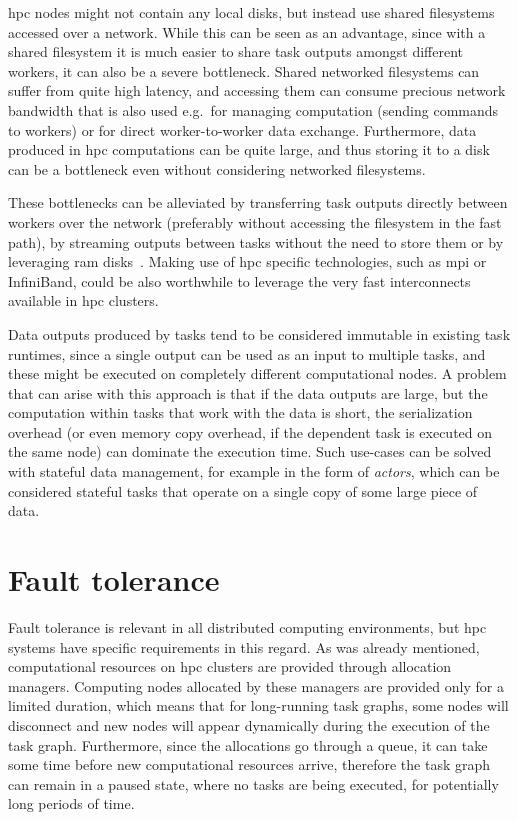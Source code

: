 \gls{hpc} nodes might not contain any local disks, but instead use shared
filesystems accessed over a network. While this can be seen as an advantage, since with a shared
filesystem it is much easier to share task outputs amongst different workers, it can also be a
severe bottleneck. Shared networked filesystems can suffer from quite high latency, and accessing
them can consume precious network bandwidth that is also used e.g.\ for managing computation
(sending commands to workers) or for direct worker-to-worker data exchange. Furthermore, data
produced in \gls{hpc} computations can be quite large, and thus storing it to a
disk can be a bottleneck even without considering networked filesystems.

These bottlenecks can be alleviated by transferring task outputs directly between workers over the
network (preferably without accessing the filesystem in the fast path), by streaming outputs
between tasks without the need to store them or by leveraging \gls{ram}
disks~\cite{hyperloom}. Making use of \gls{hpc} specific technologies,
such as \gls{mpi} or InfiniBand, could be also worthwhile to leverage the very
fast interconnects available in \gls{hpc} clusters.

Data outputs produced by tasks tend to be considered immutable in existing task runtimes, since a
single output can be used as an input to multiple tasks, and these might be executed on completely
different computational nodes. A problem that can arise with this approach is that if the data
outputs are large, but the computation within tasks that work with the data is short, the
serialization overhead (or even memory copy overhead, if the dependent task is executed on the same
node) can dominate the execution time. Such use-cases can be solved with stateful data management,
for example in the form of \emph{actors}, which can be considered stateful tasks that
operate on a single copy of some large piece of data.

\section{Fault tolerance}
Fault tolerance is relevant in all distributed computing environments, but
\gls{hpc} systems have specific requirements in this regard. As was already
mentioned, computational resources on \gls{hpc} clusters are provided through
allocation managers. Computing nodes allocated by these managers are provided only for a limited
duration, which means that for long-running task graphs, some nodes will disconnect and new nodes
will appear dynamically during the execution of the task graph. Furthermore, since the allocations
go through a queue, it can take some time before new computational resources arrive, therefore the
task graph can remain in a paused state, where no tasks are being executed, for potentially long
periods of time.

